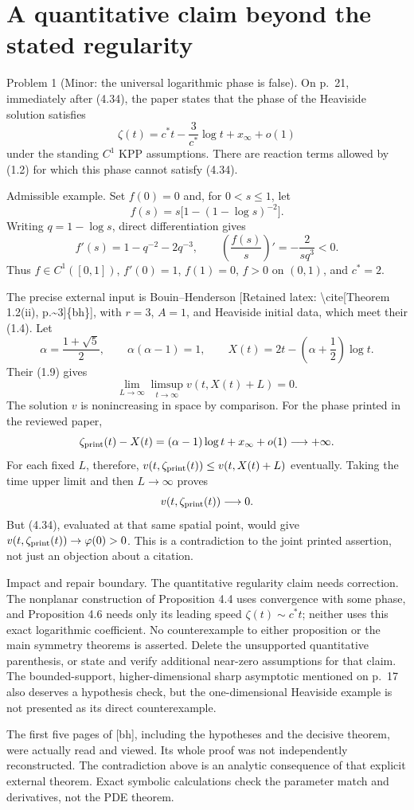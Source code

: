 \documentclass[10pt]{article}
\begin{document}
\section*{A quantitative claim beyond the stated regularity}
Problem 1 (Minor: the universal logarithmic phase is false).  On p. 21, immediately after (4.34), the paper states that the phase of the Heaviside solution satisfies \[\zeta(t)=c^*t-\frac{3}{c^*}\log t+x_\infty+o(1)\] under the standing \(C^1\) KPP assumptions. There are reaction terms allowed by (1.2) for which this phase cannot satisfy (4.34).\par
Admissible example. Set \(f(0)=0\) and, for \(0<s\le1\), let \[f(s)=s\bigl[1-(1-\log s)^{-2}\bigr].\] Writing \(q=1-\log s\), direct differentiation gives \[f'(s)=1-q^{-2}-2q^{-3},\qquad
 \left(\frac{f(s)}s\right)'=-\frac{2}{s q^3}<0.\] Thus \(f\in C^1([0,1])\), \(f'(0)=1\), \(f(1)=0\), \(f>0\) on \((0,1)\), and \(c^*=2\).\par
The precise external input is Bouin–Henderson [Retained latex: \textbackslash{}cite[Theorem 1.2(ii), p.\textasciitilde{}3]\{bh\}], with \(r=3\), \(A=1\), and Heaviside initial data, which meet their (1.4). Let \[\alpha=\frac{1+\sqrt5}{2},\qquad
 \alpha(\alpha-1)=1,\qquad
 X(t)=2t-\left(\alpha+\frac12\right)\log t.\] Their (1.9) gives \[\lim_{L\to\infty}\limsup_{t\to\infty}
                  v(t,X(t)+L)=0.\] The solution \(v\) is nonincreasing in space by comparison. For the phase printed in the reviewed paper, \[\zeta_{\rm print}(t)-X(t)
       =(\alpha-1)\log t+x_\infty+o(1)\longrightarrow+\infty.\] For each fixed \(L\), therefore, \(v(t,\zeta_{\rm print}(t))\le v(t,X(t)+L)\) eventually. Taking the time upper limit and then \(L\to\infty\) proves \[v(t,\zeta_{\rm print}(t))\longrightarrow0.\] But (4.34), evaluated at that same spatial point, would give \(v(t,\zeta_{\rm print}(t))\to\varphi(0)>0\). This is a contradiction to the joint printed assertion, not just an objection about a citation.\par
Impact and repair boundary. The quantitative regularity claim needs correction. The nonplanar construction of Proposition 4.4 uses convergence with some phase, and Proposition 4.6 needs only its leading speed \(\zeta(t)\sim c^*t\); neither uses this exact logarithmic coefficient. No counterexample to either proposition or the main symmetry theorems is asserted. Delete the unsupported quantitative parenthesis, or state and verify additional near-zero assumptions for that claim. The bounded-support, higher-dimensional sharp asymptotic mentioned on p. 17 also deserves a hypothesis check, but the one-dimensional Heaviside example is not presented as its direct counterexample.\par
The first five pages of [bh], including the hypotheses and the decisive theorem, were actually read and viewed. Its whole proof was not independently reconstructed. The contradiction above is an analytic consequence of that explicit external theorem. Exact symbolic calculations check the parameter match and derivatives, not the PDE theorem.\par
\end{document}
